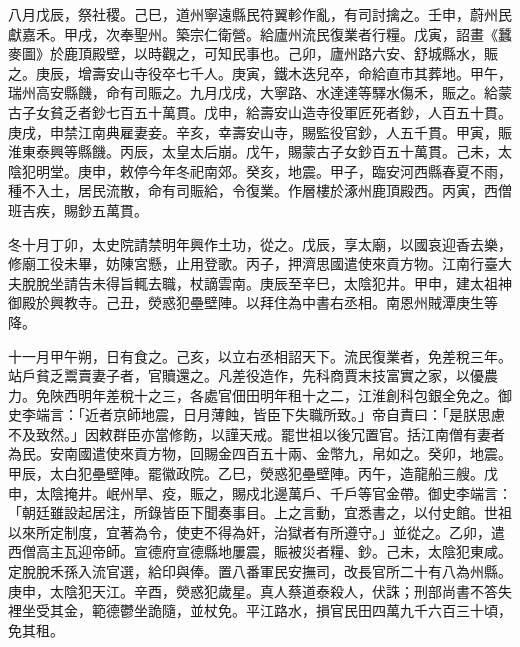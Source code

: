 \begin{pinyinscope}
 八月戊辰，祭社稷。己巳，道州寧遠縣民符翼軫作亂，有司討擒之。壬申，蔚州民獻嘉禾。甲戌，次奉聖州。築宗仁衛營。給廬州流民復業者行糧。戊寅，詔畫《蠶麥圖》於鹿頂殿壁，以時觀之，可知民事也。己卯，廬州路六安、舒城縣水，賑之。庚辰，增壽安山寺役卒七千人。庚寅，鐵木迭兒卒，命給直市其葬地。甲午，瑞州高安縣饑，命有司賑之。九月戊戌，大寧路、水達達等驛水傷禾，賑之。給蒙古子女貧乏者鈔七百五十萬貫。戊申，給壽安山造寺役軍匠死者鈔，人百五十貫。庚戌，申禁江南典雇妻妾。辛亥，幸壽安山寺，賜監役官鈔，人五千貫。甲寅，賑淮東泰興等縣饑。丙辰，太皇太后崩。戊午，賜蒙古子女鈔百五十萬貫。己未，太陰犯明堂。庚申，敕停今年冬祀南郊。癸亥，地震。甲子，臨安河西縣春夏不雨，種不入土，居民流散，命有司賑給，令復業。作層樓於涿州鹿頂殿西。丙寅，西僧班吉疾，賜鈔五萬貫。



 冬十月丁卯，太史院請禁明年興作土功，從之。戊辰，享太廟，以國哀迎香去樂，修廟工役未畢，妨陳宮懸，止用登歌。丙子，押濟思國遣使來貢方物。江南行臺大夫脫脫坐請告未得旨輒去職，杖謫雲南。庚辰至辛巳，太陰犯井。甲申，建太祖神御殿於興教寺。己丑，熒惑犯壘壁陣。以拜住為中書右丞相。南恩州賊潭庚生等降。



 十一月甲午朔，日有食之。己亥，以立右丞相詔天下。流民復業者，免差稅三年。站戶貧乏鬻賣妻子者，官贖還之。凡差役造作，先科商賈末技富實之家，以優農力。免陜西明年差稅十之三，各處官佃田明年租十之二，江淮創科包銀全免之。御史李端言：「近者京師地震，日月薄蝕，皆臣下失職所致。」帝自責曰：「是朕思慮不及致然。」因敕群臣亦當修飭，以謹天戒。罷世祖以後冗置官。括江南僧有妻者為民。安南國遣使來貢方物，回賜金四百五十兩、金幣九，帛如之。癸卯，地震。甲辰，太白犯壘壁陣。罷徽政院。乙巳，熒惑犯壘壁陣。丙午，造龍船三艘。戊申，太陰掩井。岷州旱、疫，賑之，賜戍北邊萬戶、千戶等官金帶。御史李端言：「朝廷雖設起居注，所錄皆臣下聞奏事目。上之言動，宜悉書之，以付史館。世祖以來所定制度，宜著為令，使吏不得為奸，治獄者有所遵守。」並從之。乙卯，遣西僧高主瓦迎帝師。宣德府宣德縣地屢震，賑被災者糧、鈔。己未，太陰犯東咸。定脫脫禾孫入流官選，給印與俸。置八番軍民安撫司，改長官所二十有八為州縣。庚申，太陰犯天江。辛酉，熒惑犯歲星。真人蔡道泰殺人，伏誅；刑部尚書不答失裡坐受其金，範德鬱坐詭隨，並杖免。平江路水，損官民田四萬九千六百三十頃，免其租。




\end{pinyinscope}
